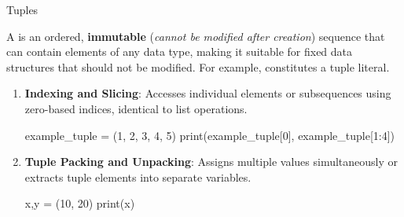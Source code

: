 \documentclass[10pt]{article}
\begin{document}
    \begin{core}{Tuples}

      A  is an ordered, \textbf{immutable} (\textit{cannot be modified after creation}) sequence that can contain elements of any data type, making it suitable for fixed data structures that should not be modified. For example,  constitutes a tuple literal.

      \begin{enumerate}

        \item \textbf{Indexing and Slicing}: Accesses individual elements or subsequences using zero-based indices, identical to list operations.

        \begin{pyconsole}

          example_tuple = (1, 2, 3, 4, 5)
          print(example_tuple[0], example_tuple[1:4])

        \end{pyconsole}

        \item \textbf{Tuple Packing and Unpacking}: Assigns multiple values simultaneously or extracts tuple elements into separate variables.

        \begin{pyconsole}

          x,y = (10, 20)
          print(x)

        \end{pyconsole}

      \end{enumerate}

    \end{core}
\end{document}
